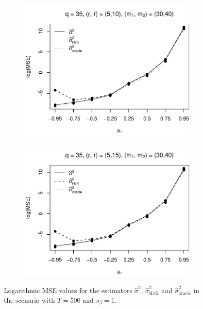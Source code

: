 \begin{figure}[p]
\begin{subfigure}[b]{0.45\textwidth}
\includegraphics[width=\textwidth]{Plots/Plots_Supplement/MSE_lrv_T=500_slope=1_(L1,L2,K1,K2,M1,M2)=(35,35,5,10,30,40).pdf}
\end{subfigure}
\hspace{0.25cm}
\begin{subfigure}[b]{0.45\textwidth}
\includegraphics[width=\textwidth]{Plots/Plots_Supplement/MSE_lrv_T=500_slope=1_(L1,L2,K1,K2,M1,M2)=(35,35,5,15,30,40).pdf}
\end{subfigure}
\caption{Logarithmic MSE values for the estimators $\widehat{\sigma}^2$, $\widehat{\sigma}^2_{\text{HvK}}$ and $\widehat{\sigma}^2_{\text{oracle}}$ in the scenario with $T=500$ and $s_\beta=1$.}\label{fig:MSE_slope1_lrv_robust}
\end{figure}


